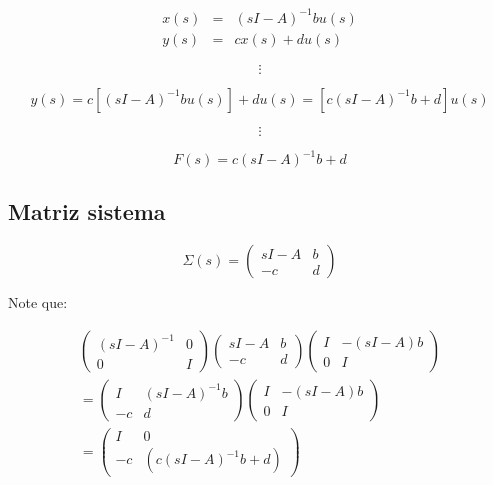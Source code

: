 \documentclass[12pt]{article}
\numberwithin{equation}{subsection}
\begin{document}
\begin{eqnarray}
x(s) & = & (s I - A)^{-1} b u(s) \nonumber \\
y(s) & = & c x(s) + d u(s) \nonumber
\end{eqnarray}

\begin{equation}
\vdots \nonumber
\end{equation}

\begin{equation}
y(s) = c[(s I - A)^{-1} b u(s)] + d u(s) = [c(s I - A)^{-1} b + d] u(s) \nonumber
\end{equation}

\begin{equation}
\vdots \nonumber
\end{equation}

\begin{equation}
F(s) = c(s I - A)^{-1} b + d
\end{equation}

\subsection{Matriz sistema}

\begin{equation}
\Sigma(s) =
\begin{pmatrix}
sI - A & b \\
-c & d
\end{pmatrix}
\end{equation}

Note que:

\begin{multline}
\begin{pmatrix}
(sI - A)^{-1} & 0 \\
0 & I
\end{pmatrix}
\begin{pmatrix}
sI - A & b \\
-c & d
\end{pmatrix}
\begin{pmatrix}
I & -(sI - A)b \\
0 & I
\end{pmatrix}
\\
=
\begin{pmatrix}
I & (sI - A)^{-1} b \\
-c & d
\end{pmatrix}
\begin{pmatrix}
I & -(sI - A)b \\
0 & I
\end{pmatrix}
\\
=
\begin{pmatrix}
I & 0 \\
-c & (c(sI - A)^{-1} b + d)
\end{pmatrix}
\nonumber
\end{multline}
\end{document}
